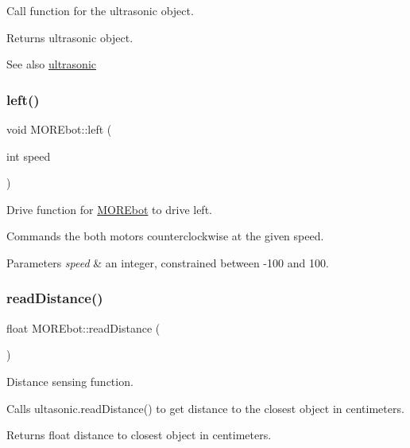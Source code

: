 Call function for the ultrasonic object. 

\begin{DoxyReturn}{Returns}
ultrasonic object. 
\end{DoxyReturn}
\begin{DoxySeeAlso}{See also}
\mbox{\hyperlink{classultrasonic}{ultrasonic}} 
\end{DoxySeeAlso}
\mbox{\label{class_m_o_r_ebot_ae1b5d9ec8043062fdfe9c9fd49dbeeba}} 
\subsubsection{\texorpdfstring{left()}{left()}}
{\footnotesize\ttfamily void M\+O\+R\+Ebot\+::left (\begin{DoxyParamCaption}\item[{int}]{speed }\end{DoxyParamCaption})}



Drive function for \mbox{\hyperlink{class_m_o_r_ebot}{M\+O\+R\+Ebot}} to drive left. 

Commands the both motors counterclockwise at the given speed. 
\begin{DoxyParams}{Parameters}
{\em speed} & an integer, constrained between -\/100 and 100. \\
\hline
\end{DoxyParams}
\mbox{\label{class_m_o_r_ebot_a5720fa06b9900f5b5aba574a7507e3dc}} 
\subsubsection{\texorpdfstring{readDistance()}{readDistance()}}
{\footnotesize\ttfamily float M\+O\+R\+Ebot\+::read\+Distance (\begin{DoxyParamCaption}{ }\end{DoxyParamCaption})}



Distance sensing function. 

Calls ultasonic.\+read\+Distance() to get distance to the closest object in centimeters. \begin{DoxyReturn}{Returns}
float distance to closest object in centimeters. 
\end{DoxyReturn}
\mbox{\label{class_m_o_r_ebot_a2e6c104080d6213165668db05122ecbf}} 
